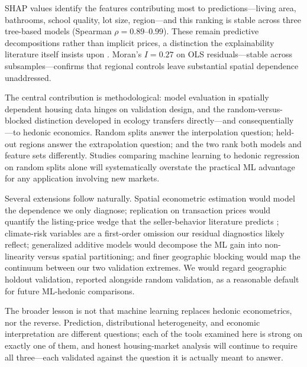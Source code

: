SHAP values identify the features contributing most to predictions---living
area, bathrooms, school quality, lot size, region---and this ranking is stable
across three tree-based models (Spearman $\rho = 0.89$--$0.99$). These remain
predictive decompositions rather than implicit prices, a distinction the
explainability literature itself insists upon \citep{rudin2019stop}. Moran's
$I = 0.27$ on OLS residuals---stable across subsamples---confirms that regional
controls leave substantial spatial dependence unaddressed.

The central contribution is methodological: model evaluation in spatially
dependent housing data hinges on validation design, and the random-versus-blocked
distinction developed in ecology \citep{roberts2017cross, ploton2020spatial,
meyer2021predicting, wadoux2021spatial} transfers directly---and consequentially
---to hedonic economics. Random splits answer the interpolation question; held-out
regions answer the extrapolation question; and the two rank both models and
feature sets differently. Studies comparing machine learning to hedonic
regression on random splits alone will systematically overstate the practical ML
advantage for any application involving new markets.

Several extensions follow naturally. Spatial econometric estimation
\citep{lesage2009introduction} would model the dependence we only diagnose;
replication on transaction prices would quantify the listing-price wedge that the
seller-behavior literature predicts \citep{genesove2001loss, han2016role};
climate-risk variables \citep{bernstein2019disaster, murfin2020risk} are a
first-order omission our residual diagnostics likely reflect; generalized
additive models would decompose the ML gain into non-linearity versus spatial
partitioning; and finer geographic blocking would map the continuum between our
two validation extremes. We would regard geographic holdout validation, reported
alongside random validation, as a reasonable default for future ML-hedonic
comparisons.

The broader lesson is not that machine learning replaces hedonic econometrics,
nor the reverse. Prediction, distributional heterogeneity, and economic
interpretation are different questions; each of the tools examined here is strong
on exactly one of them, and honest housing-market analysis will continue to
require all three---each validated against the question it is actually meant to
answer.
